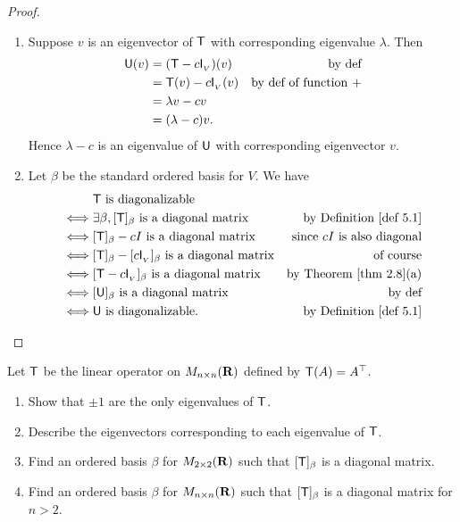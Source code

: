 \begin{proof} \ 

\begin{enumerate}
\item Suppose \(v\) is an eigenvector of \(\textsf{T}\) with corresponding eigenvalue \(\lambda\).
Then
\begin{align*}
    \textsf{U}(v) & = (\textsf{T} - c \textsf{I}_{_V})(v) & \text{by def} \\
          & = \textsf{T}(v) - c\textsf{I}_{_V}(v) & \text{by def of function \(+\)} \\
          & = \lambda v - c v \\
          & = (\lambda - c)v.
\end{align*}
Hence \(\lambda - c\) is an eigenvalue of \(\textsf{U}\) with corresponding eigenvector \(v\).

\item
Let \(\beta\) be the standard ordered basis for \(V\).
We have
\begin{align*}
         & \T \text{ is diagonalizable} \\
    \iff & \exists \beta, [\T]_{\beta} \text{ is a diagonal matrix} & \text{by \DEF{5.1}} \\
    \iff & [\T]_{\beta} - c I \text{ is a diagonal matrix} & \text{since \(c I\) is also diagonal} \\
    \iff & [\T]_{\beta} - [c \ITRANV]_{\beta} \text{ is a diagonal matrix} & \text{of course} \\
    \iff & [\T - c \ITRANV]_{\beta} \text{ is a diagonal matrix} & \text{by \THM{2.8}(a)} \\
    \iff & [\U]_{\beta} \text{ is a diagonal matrix} & \text{by def} \\
    \iff & \U \text{ is diagonalizable}. & \text{by \DEF{5.1}}
\end{align*}
\end{enumerate}
\end{proof}

\begin{exercise} \label{exercise 5.1.18}
Let \(\textsf{T}\) be the linear operator on \(M_{n \times n}(\mathbf{R})\) defined by \(\textsf{T}(A) = A^\top\).
\begin{enumerate}
\item Show that \(\pm 1\) are the only eigenvalues of \(\textsf{T}\).
\item Describe the eigenvectors corresponding to each eigenvalue of \(\textsf{T}\).
\item Find an ordered basis \(\beta\) for \(M_{2 \times 2}(\mathbf{R})\) such that \([\textsf{T}]_{\beta}\) is a diagonal matrix.
\item Find an ordered basis \(\beta\) for \(M_{n \times n}(\mathbf{R})\) such that \([\textsf{T}]_{\beta}\) is a diagonal
matrix for \(n > 2\).
\end{enumerate}
\end{exercise}

